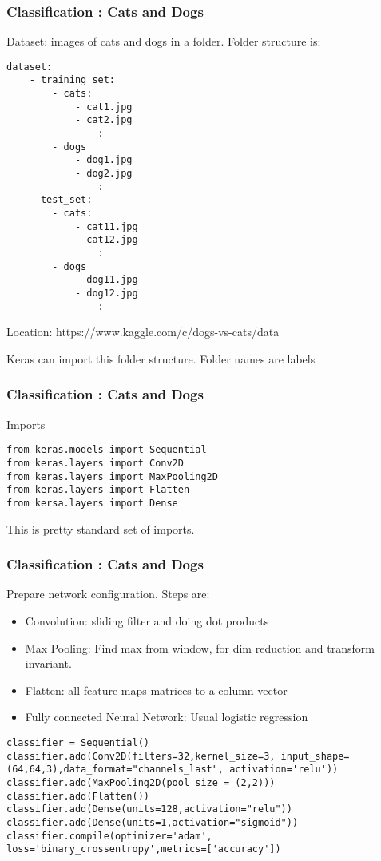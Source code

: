\begin{frame}[fragile] \frametitle{Classification : Cats and Dogs}
Dataset: images of cats and dogs in a folder. Folder structure is:
\begin{lstlisting}
dataset:
	- training_set:
		- cats:
			- cat1.jpg
			- cat2.jpg		
				:	
		- dogs
			- dog1.jpg
			- dog2.jpg		
				:	
	- test_set:
		- cats:
			- cat11.jpg
			- cat12.jpg		
				:	
		- dogs
			- dog11.jpg
			- dog12.jpg		
				:					
\end{lstlisting}

Location: https://www.kaggle.com/c/dogs-vs-cats/data

Keras can import this folder structure. Folder names are labels
\end{frame}

\begin{frame}[fragile] \frametitle{Classification : Cats and Dogs}
Imports
\begin{lstlisting}
from keras.models import Sequential
from keras.layers import Conv2D
from keras.layers import MaxPooling2D
from keras.layers import Flatten
from kersa.layers import Dense
\end{lstlisting}

This is pretty standard set of imports.
\end{frame}

\begin{frame}[fragile] \frametitle{Classification : Cats and Dogs}
Prepare network configuration. Steps are:
\begin{itemize}
\item Convolution: sliding filter and doing dot products
\item Max Pooling: Find max from window, for dim reduction and transform invariant.
\item Flatten: all feature-maps matrices to a column vector
\item Fully connected Neural Network: Usual logistic regression
\end{itemize}
\begin{lstlisting}
classifier = Sequential()
classifier.add(Conv2D(filters=32,kernel_size=3, input_shape=(64,64,3),data_format="channels_last", activation='relu'))
classifier.add(MaxPooling2D(pool_size = (2,2)))
classifier.add(Flatten())
classifier.add(Dense(units=128,activation="relu"))
classifier.add(Dense(units=1,activation="sigmoid"))
classifier.compile(optimizer='adam', loss='binary_crossentropy',metrics=['accuracy'])
\end{lstlisting}

\end{frame}

